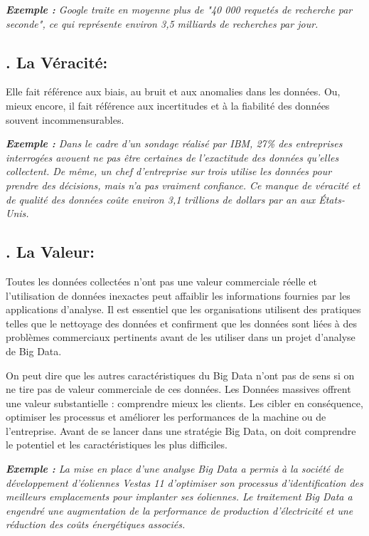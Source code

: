 \textit{\textbf{Exemple :} Google traite en moyenne plus de "40 000 requetés de recherche par seconde", ce qui représente environ 3,5 milliards de recherches par jour.}

\subsection*{. La Véracité:}
Elle fait référence aux biais, au bruit et aux anomalies dans les données. Ou, mieux encore, il fait référence aux incertitudes et à la fiabilité des données souvent incommensurables.

\textit{\textbf{Exemple :} Dans le cadre d'un sondage réalisé par IBM, 27\% des entreprises interrogées avouent ne pas être certaines de l'exactitude des données qu'elles collectent. De même, un chef d'entreprise sur trois utilise les données pour prendre des décisions, mais n'a pas vraiment confiance. Ce manque de véracité et de qualité des données coûte environ 3,1 trillions de dollars par an aux États-Unis.}

\subsection*{. La Valeur:}
Toutes les données collectées n'ont pas une valeur commerciale réelle et l'utilisation de données inexactes peut affaiblir les informations fournies par les applications d'analyse. Il est essentiel que les organisations utilisent des pratiques telles que le nettoyage des données et confirment que les données sont liées à des problèmes commerciaux pertinents avant de les utiliser dans un projet d'analyse de Big Data. 

On peut dire que les autres caractéristiques du Big Data n'ont pas de sens si on ne tire pas de valeur commerciale de ces données. Les Données massives offrent une valeur substantielle : comprendre mieux les clients. Les cibler en conséquence, optimiser les processus et améliorer les performances de la machine ou de l'entreprise. Avant de se lancer dans une stratégie Big Data, on doit comprendre le potentiel et les caractéristiques les plus difficiles.

\textit{\textbf{Exemple :} La mise en place d'une analyse Big Data a permis à la société de développement d'éoliennes Vestas 11 d'optimiser son processus d'identification des meilleurs emplacements pour implanter ses éoliennes. Le traitement Big Data a engendré une augmentation de la performance de production d'électricité et une réduction des coûts énergétiques associés.}

